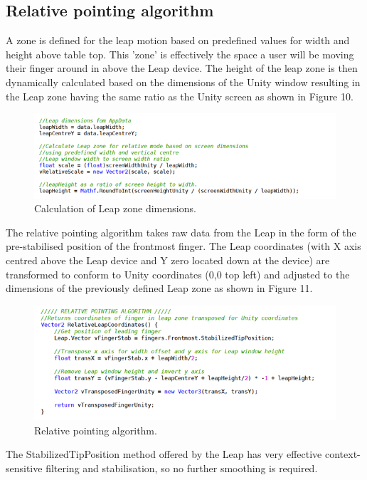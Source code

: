 \documentclass[titlepage]{article}
\begin{document}
\subsection{Relative pointing algorithm}
A zone is defined for the leap motion based on predefined values for width and height above table top. This 'zone' is effectively the space a user will be moving their finger around in above the Leap device. The height of the leap zone is then dynamically calculated based on the dimensions of the Unity window resulting in the Leap zone having the same ratio as the Unity screen as shown in Figure 10.

\begin{figure}[!h]
    \centering
    \includegraphics[width=7.0in]{Figure_10}
    \caption{Calculation of Leap zone dimensions.}
\end{figure}

The relative pointing algorithm takes raw data from the Leap in the form of the pre-stabilised position of the frontmost finger. The Leap coordinates (with X axis centred above the Leap device and Y zero located down at the device) are transformed to conform to Unity coordinates (0,0 top left) and adjusted to the dimensions of the previously defined Leap zone as shown in Figure 11.

\begin{figure}[!h]
    \centering
    \includegraphics[width=7.0in]{Figure_11}
    \caption{Relative pointing algorithm.}
\end{figure}
 
The StabilizedTipPosition method offered by the Leap has very effective context-sensitive filtering and stabilisation, so no further smoothing is required.
\end{document}
